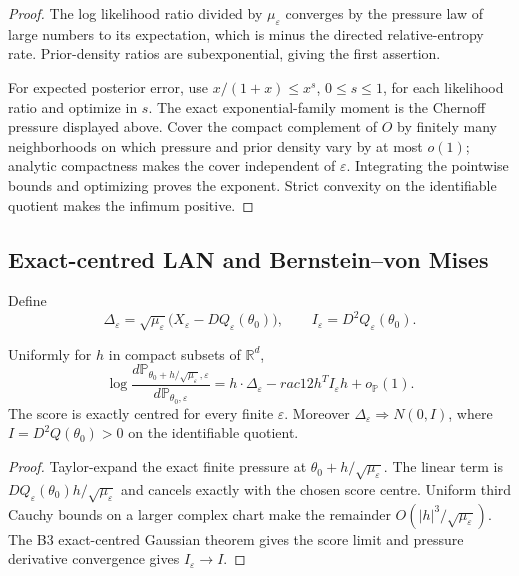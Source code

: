 \begin{proof}
The log likelihood ratio divided by \(\mu_\varepsilon\) converges by the
pressure law of large numbers to its expectation, which is minus the directed
relative-entropy rate.  Prior-density ratios are subexponential, giving the
first assertion.

For expected posterior error, use
\(x/(1+x)\le x^s\), \(0\le s\le1\), for each likelihood ratio and optimize in
\(s\).  The exact exponential-family moment is the Chernoff pressure displayed
above.  Cover the compact complement of \(O\) by finitely many neighborhoods
on which pressure and prior density vary by at most \(o(1)\); analytic
compactness makes the cover independent of \(\varepsilon\).  Integrating the
pointwise bounds and optimizing proves the exponent.  Strict convexity on the
identifiable quotient makes the infimum positive.
\end{proof}

\subsection{Exact-centred LAN and Bernstein--von Mises}

Define
\[
\Delta_\varepsilon=\sqrt{\mu_\varepsilon}
\bigl(X_\varepsilon-DQ_\varepsilon(\theta_0)\bigr),
\qquad
I_\varepsilon=D^2Q_\varepsilon(\theta_0).
\]

\begin{theorem}
\label{thm:r6-c1-lan}
Uniformly for \(h\) in compact subsets of \(\mathbb R^d\),
\[
\log\frac{d\mathbb P_{\theta_0+h/\sqrt{\mu_\varepsilon},\varepsilon}}
{d\mathbb P_{\theta_0,\varepsilon}}
=h\cdot\Delta_\varepsilon-rac12h^TI_\varepsilon h+o_{\mathbb P}(1).
\]
The score is exactly centred for every finite \(\varepsilon\).  Moreover
\(\Delta_\varepsilon\Rightarrow N(0,I)\), where
\(I=D^2Q(\theta_0)>0\) on the identifiable quotient.
\end{theorem}

\begin{proof}
Taylor-expand the exact finite pressure at
\(\theta_0+h/\sqrt{\mu_\varepsilon}\).  The linear term is
\(DQ_\varepsilon(\theta_0)h/\sqrt{\mu_\varepsilon}\) and cancels exactly with
the chosen score centre.  Uniform third Cauchy bounds on a larger complex
chart make the remainder \(O(|h|^3/\sqrt{\mu_\varepsilon})\).  The B3
exact-centred Gaussian theorem gives the score limit and pressure derivative
convergence gives \(I_\varepsilon\to I\).
\end{proof}

